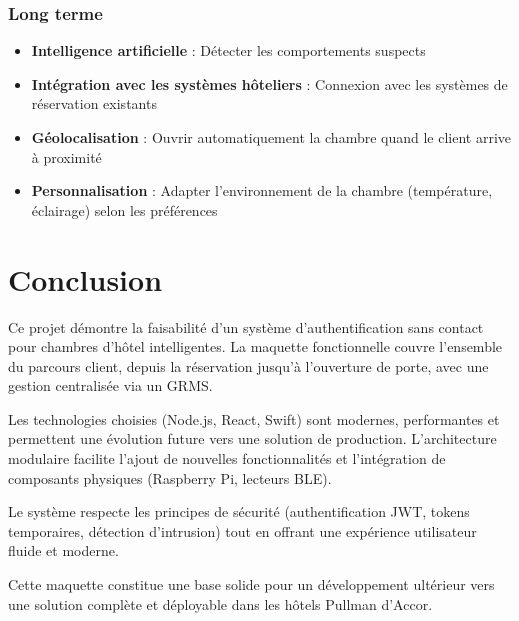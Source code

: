 \documentclass[11pt,a4paper]{article}
\begin{document}
\subsubsection{Long terme}

\begin{itemize}
    \item \textbf{Intelligence artificielle} : Détecter les comportements suspects
    \item \textbf{Intégration avec les systèmes hôteliers} : Connexion avec les systèmes de réservation existants
    \item \textbf{Géolocalisation} : Ouvrir automatiquement la chambre quand le client arrive à proximité
    \item \textbf{Personnalisation} : Adapter l'environnement de la chambre (température, éclairage) selon les préférences
\end{itemize}

\section{Conclusion}

Ce projet démontre la faisabilité d'un système d'authentification sans contact pour chambres d'hôtel intelligentes. La maquette fonctionnelle couvre l'ensemble du parcours client, depuis la réservation jusqu'à l'ouverture de porte, avec une gestion centralisée via un GRMS.

Les technologies choisies (Node.js, React, Swift) sont modernes, performantes et permettent une évolution future vers une solution de production. L'architecture modulaire facilite l'ajout de nouvelles fonctionnalités et l'intégration de composants physiques (Raspberry Pi, lecteurs BLE).

Le système respecte les principes de sécurité (authentification JWT, tokens temporaires, détection d'intrusion) tout en offrant une expérience utilisateur fluide et moderne.

Cette maquette constitue une base solide pour un développement ultérieur vers une solution complète et déployable dans les hôtels Pullman d'Accor.
\end{document}

